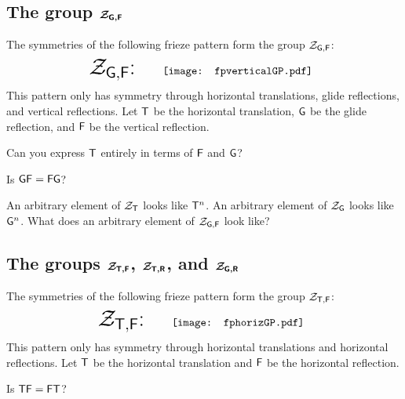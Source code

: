 \documentclass{ximera}
\begin{document}
\subsection{The group $\boldsymbol{\mathcal{Z}_{\mathsf{G},\mathsf{F}}}$}

The symmetries of the following frieze pattern form the group $\mathcal{Z}_{\mathsf{G},\mathsf{F}}$:
\[
\text{\huge $\Zgf$:}\qquad\begin{array}{c}
\texttt{[image: fpverticalGP.pdf]}
\end{array}
\]
This pattern only has symmetry through horizontal translations, glide
reflections, and vertical reflections. Let $\mathsf{T}$ be the horizontal
translation, $\mathsf{G}$ be the glide reflection, and $\mathsf{F}$ be the
vertical reflection.

\begin{question} 
Can you express $\mathsf{T}$ entirely in terms of $\mathsf{F}$ and
$\mathsf{G}$?
\end{question}


\begin{question} Is $\mathsf{G}\mathsf{F} = \mathsf{F}\mathsf{G}$?
\end{question}



\begin{question}
An arbitrary element of $\mathcal{Z}_\mathsf{T}$ looks like $\mathsf{T}^n$. An arbitrary
element of $\mathcal{Z}_\mathsf{G}$ looks like $\mathsf{G}^n$. What does an arbitrary element
of $\mathcal{Z}_{\mathsf{G},\mathsf{F}}$ look like?
\end{question}







\subsection{The groups $\boldsymbol{\mathcal{Z}_{\mathsf{T},\mathsf{F}}}$, $\boldsymbol{\mathcal{Z}_{\mathsf{T},\mathsf{R}}}$, and $\boldsymbol{\mathcal{Z}_{\mathsf{G},\mathsf{R}}}$}


The symmetries of the following frieze pattern form the group $\mathcal{Z}_{\mathsf{T},\mathsf{F}}$:
\[
\text{\huge $\Ztf$:}\qquad\begin{array}{c}
\texttt{[image: fphorizGP.pdf]}
\end{array}
\]
This pattern only has symmetry through horizontal translations and
horizontal reflections. Let $\mathsf{T}$ be the horizontal translation
and $\mathsf{F}$ be the horizontal reflection.

\begin{question} Is $\mathsf{T}\mathsf{F} = \mathsf{F}\mathsf{T}$?
\end{question}
\end{document}
